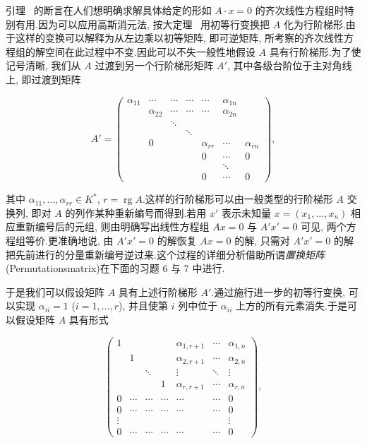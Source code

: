 引理~ 的断言在人们想明确求解具体给定的形如 $A \cdot x = 0$ 的齐次线性方程组时特别有用.因为可以应用高斯消元法, 按大定理~ 用初等行变换把 $A$ 化为行阶梯形.由于这样的变换可以解释为从左边乘以初等矩阵, 即可逆矩阵, 所考察的齐次线性方程组的解空间在此过程中不变.因此可以不失一般性地假设 $A$ 具有行阶梯形.为了使记号清晰, 我们从 $A$ 过渡到另一个行阶梯形矩阵 $A'$, 其中各级台阶位于主对角线上, 即过渡到矩阵

\[
A' = \begin{pmatrix}
\alpha_{11} & \cdots & \cdots & \cdots & \cdots & \alpha_{1n} \\
& \alpha_{22} & \cdots & \cdots & \cdots & \alpha_{2n} \\
& & \ddots \\
& & & \ddots \\
& 0 & & & \alpha_{rr} & \cdots & \alpha_{rn} \\
& & & & 0 & \cdots & 0 \\
& & & & & \ddots \\
& & & & 0 & \cdots & 0
\end{pmatrix},
\]

其中 $\alpha_{11}, \ldots, \alpha_{rr} \in K^*$, $r = \operatorname{rg} A$.这样的行阶梯形可以由一般类型的行阶梯形 $A$ 交换列, 即对 $A$ 的列作某种重新编号而得到.若用 $x'$ 表示未知量 $x = (x_1, \ldots, x_n)$ 相应重新编号后的元组, 则由明确写出线性方程组 $Ax = 0$ 与 $A'x' = 0$ 可见, 两个方程组等价.更准确地说, 由 $A'x' = 0$ 的解恢复 $Ax = 0$ 的解, 只需对 $A'x' = 0$ 的解把先前进行的分量重新编号逆过来.这个过程的详细分析借助所谓\emph{置换矩阵}(\textup{Permutationsmatrix})在下面的习题 6 与 7 中进行.

于是我们可以假设矩阵 $A$ 具有上述行阶梯形 $A'$.通过施行进一步的初等行变换, 可以实现 $\alpha_{ii} = 1$ ($i = 1, \ldots, r$), 并且使第 $i$ 列中位于 $\alpha_{ii}$ 上方的所有元素消失.于是可以假设矩阵 $A$ 具有形式

\[
\begin{pmatrix}
1 & & & & \alpha_{1, r + 1} & \cdots & \alpha_{1, n} \\
& 1 & & & \alpha_{2, r + 1} & \cdots & \alpha_{2, n} \\
& & \ddots & & \vdots & \ddots & \vdots \\
& & & 1 & \alpha_{r, r + 1} & \cdots & \alpha_{r, n} \\
0 & \cdots & \cdots & \cdots & \cdots & \cdots & 0 \\
0 & \cdots & \cdots & \cdots & \cdots & \cdots & 0 \\
\vdots & & & & & & \vdots \\
0 & \cdots & \cdots & \cdots & \cdots & \cdots & 0
\end{pmatrix},
\]

